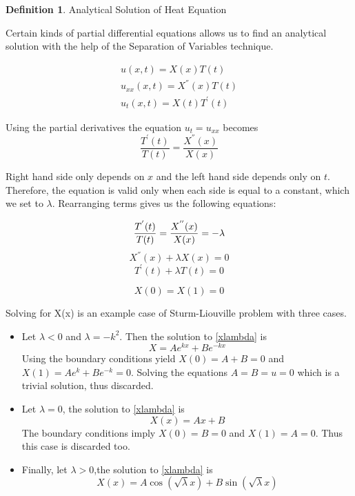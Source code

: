 \documentclass[12pt, oneside]{book}
\theoremstyle{plain}
\theoremstyle{definition}
\newtheorem{definition}[theorem]{Definition}
\begin{document}
\begin{definition}\label{heatAnal} Analytical Solution of Heat Equation

Certain kinds of partial differential equations allows us to find an analytical solution with the help of the Separation of Variables technique.

\begin{eqnarray}
u(x,t) = X(x) T(t) \\[10pt]
u_{xx}(x, t) = X^{''}(x) T(t) \\[10pt]
u_t (x,t) = X(t) T^{'}(t)
\end{eqnarray}

Using the partial derivatives the equation $ u_t = u_{xx} $ becomes
\begin{equation}
\frac{T^{'}(t)}{T(t)}  = \frac{X^{''}(x)}{X(x)}
\end{equation}

Right hand side only depends on $x$ and the left hand side depends only on $t$. Therefore, the equation is valid only when each side is equal to a constant, which we set to $ \lambda $. Rearranging terms gives us the following equations:

\begin{equation}
\frac{T^{'}(t)}{T(t)}  = \frac{X^{''}(x)}{X(x)} = -\lambda \\[10pt]
\end{equation}
\begin{equation}\label{xlambda}
X^{''}(x)  + \lambda X(x) = 0 
\end{equation}
\begin{equation}\label{tlambda}
T^{'}(t) + \lambda T(t) = 0
\end{equation}

\begin{equation}
X(0) = X(1) = 0
\end{equation}

Solving for X(x) is an example case of Sturm-Liouville problem \cite{sepvar} with three cases. 
\begin{itemize}
\item Let $\lambda < 0$ and $\lambda = -k^2$. Then the solution to \ref{xlambda} is
$$ X = Ae^{kx} + Be^{-kx} $$
Using the boundary conditions yield $X(0) = A + B = 0 $ and $X(1) = Ae^{k} + Be^{-k} = 0$. Solving the equations $A=B=u=0$ which is a trivial solution, thus discarded.
\item Let $\lambda = 0$, the solution to \ref{xlambda} is
$$ X(x) = Ax + B $$
The boundary conditions imply $X(0) = B = 0$ and $X(1) = A= 0$. Thus this case is  discarded too.
\item Finally, let $\lambda>0$,the solution to \ref{xlambda} is
$$ X(x) = A \cos(\sqrt{\lambda}x) + B \sin(\sqrt{\lambda}x) $$


\end{itemize}
\end{definition}
\end{document}
